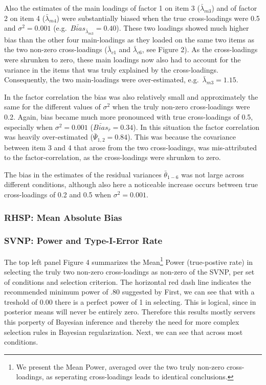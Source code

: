 \documentclass[
  man, donotrepeattitle,floatsintext]{apa6}
\begin{document}
Also the estimates of the main loadings of factor 1 on item 3 (\(\bar{\lambda}_{m 3}\)) and of factor 2 on item 4 (\(\bar{\lambda}_{m 4}\)) were substantially biased when the true cross-loadings were 0.5 and \(\sigma^2 = 0.001\) (e.g.~\(\bar{Bias}_{\bar{\lambda}_{m 3}} = 0.40\)). These two loadings showed much higher bias than the other four main-loadings as they loaded on the same two items as the two non-zero cross-loadings (\(\bar{\lambda}_{c 1}\) and \(\bar{\lambda}_{c 6}\), see Figure 2). As the cross-loadings were shrunken to zero, these main loadings now also had to account for the variance in the items that was truly explained by the cross-loadings. Consequently, the two main-loadings were over-estimated, e.g.~\(\bar{\lambda}_{m 3} = 1.15\).

In the factor correlation the bias was also relatively small and approximately the same for the different values of \(\sigma^2\) when the truly non-zero cross-loadings were 0.2. Again, bias became much more pronounced with true cross-loadings of 0.5, especially when \(\sigma^2 = 0.001\) (\(\bar{Bias}_{\bar{r}} = 0.34\)). In this situation the factor correlation was heavily over-estimated (\(\bar{\Psi}_{1,2} = 0.84\)). This was because the covariance between item 3 and 4 that arose from the two cross-loadings, was mis-attributed to the factor-correlation, as the cross-loadings were shrunken to zero.

The bias in the estimates of the residual variances \(\bar{\theta}_{1-6}\) was not large across different conditions, although also here a noticeable increase occurs between true cross-loadings of 0.2 and 0.5 when \(\sigma^2 = 0.001\).

\hypertarget{rhsp-mean-absolute-bias}{%
\subsubsection{RHSP: Mean Absolute Bias}\label{rhsp-mean-absolute-bias}}

\hypertarget{svnp-power-and-type-i-error-rate}{%
\subsubsection{SVNP: Power and Type-I-Error Rate}\label{svnp-power-and-type-i-error-rate}}

The top left panel Figure 4 summarizes the Mean\footnote{We present the Mean Power, averaged over the two truly non-zero cross-loadings, as seperating cross-loadings leads to identical conclusions.} Power (true-postive rate) in selecting the truly two non-zero cross-loadings as non-zero of the SVNP, per set of conditions and selection criterion. The horizontal red dash line indicates the recommended minimum power of .80 suggested by First, we can see that with a treshold of 0.00 there is a perfect power of 1 in selecting. This is logical, since in posterior means will never be entirely zero. Therefore this results mostly servers this porperty of Bayesian inference and thereby the need for more complex selection rules in Bayesian regularization. Next, we can see that across most conditions.
\end{document}
